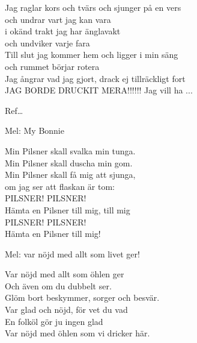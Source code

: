 \begin{SongText}[Mer öl]
\begin{SongVerse}
        Jag raglar kors och tvärs och sjunger på en vers\\%
        och undrar vart jag kan vara\\%
        i okänd trakt jag har änglavakt\\%
        och undviker varje fara\\%
        Till slut jag kommer hem och ligger i min säng\\%
        och rummet börjar rotera\\%
        Jag ångrar vad jag gjort, drack ej tillräckligt fort\\%
        JAG BORDE DRUCKIT MERA!!!!!! Jag vill ha ...
    \end{SongVerse}
    \begin{SongVerse}
        Ref…
    \end{SongVerse}
\end{SongText}
\begin{SongText}
    \begin{SongInfo}
        Mel: My Bonnie
    \end{SongInfo}
    \begin{SongVerse}
        Min Pilsner skall svalka min tunga.\\%
        Min Pilsner skall duscha min gom.\\%
        Min Pilsner skall få mig att sjunga,\\%
        om jag ser att flaskan är tom:\\%
        PILSNER! PILSNER!\\%
        Hämta en Pilsner till mig, till mig\\%
        PILSNER! PILSNER!\\%
        Hämta en Pilsner till mig!
    \end{SongVerse}
\end{SongText}
\begin{SongText}
    \begin{SongInfo}
        Mel: var nöjd med allt som livet ger!
    \end{SongInfo}
    \begin{SongVerse}
        Var nöjd med allt som öhlen ger\\%
        Och även om du dubbelt ser.\\%
        Glöm bort beskymmer, sorger och besvär.\\%
        Var glad och nöjd, för vet du vad\\%
        En folköl gör ju ingen glad\\%
        Var nöjd med öhlen som vi dricker här.
    \end{SongVerse}
\end{SongText}

